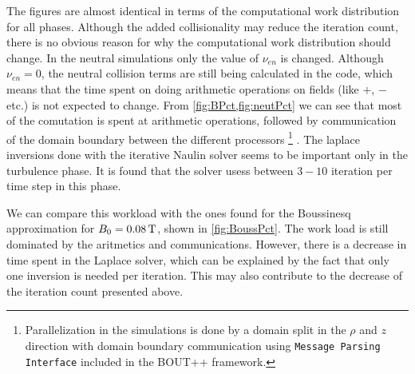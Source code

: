 %
The figures are almost identical in terms of the computational work distribution for all phases.
Although the added collisionality may reduce the iteration count, there is no obvious reason for why the computational work distribution should change.
In the neutral simulations only the value of $\nu_{en}$ is changed.
Although $\nu_{en}=0$, the neutral collision terms are still being calculated in the code, which means that the time spent on doing arithmetic operations on fields (like $+$, $-$ etc.) is not expected to change.
From \cref{fig:BPct,fig:neutPct} we can see that most of the comutation is spent at arithmetic operations, followed by communication of the domain boundary between the different processors%
\footnote{Parallelization in the simulations is done by a domain split in the $\rho$ and $z$ direction with domain boundary communication using \texttt{Message Parsing Interface} included in the BOUT++ framework.}%
.
The laplace inversions done with the iterative Naulin solver seems to be important only in the turbulence phase.
It is found that the solver usess between $3-10$ iteration per time step in this phase.

We can compare this workload with the ones found for the Boussinesq approximation for $B_0=0.08\, \text{T}$, shown in \cref{fig:BoussPct}.
The work load is still dominated by the aritmetics and communications.
However, there is a decrease in time spent in the Laplace solver, which can be explained by the fact that only one inversion is needed per iteration.
This may also contribute to the decrease of the iteration count presented above.
